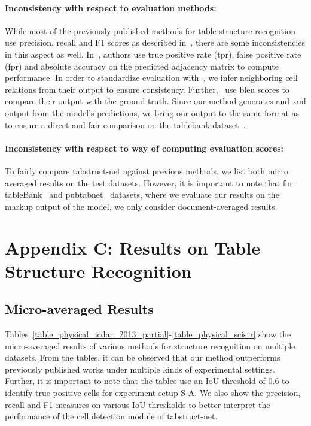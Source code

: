 \documentclass[runningheads]{llncs}
\begin{document}
\paragraph{\textbf{Inconsistency with respect to evaluation methods:}} While most of the previously published methods for table structure recognition use precision, recall and F1 scores as described in~\cite{gobel2013icdar}, there are some inconsistencies in this aspect as well. In~\cite{qasim2019rethinking}, authors use true positive rate ({\sc tpr}), false positive rate ({\sc fpr}) and absolute accuracy on the predicted adjacency matrix to compute performance. In order to standardize evaluation with~\cite{qasim2019rethinking}, we infer neighboring cell relations from their output to ensure consistency. Further,~\cite{paliwal2019tablenet} use {\sc bleu} scores to compare their output with the ground truth. Since our method generates and {\sc xml} output from the model's predictions, we bring our output to the same format as~\cite{paliwal2019tablenet} to ensure a direct and fair comparison on the {\sc t}able{\sc b}ank dataset~\cite{li2019tablebank}.

\paragraph{\textbf{Inconsistency with respect to way of computing evaluation scores:}} To fairly compare {\sc t}ab{\sc s}truct-{\sc n}et against previous methods, we list both micro averaged results on the test datasets. However, it is important to note that for {\sc t}able{\sc B}ank~\cite{li2019tablebank} and {\sc p}ub{\sc t}ab{\sc n}et~\cite{zhong2019image} datasets, where we evaluate our results on the markup output of the model, we only consider document-averaged results.

\section*{Appendix C: Results on Table Structure Recognition}

\subsection*{Micro-averaged Results}

Tables~\ref{table_physical_icdar_2013_partial}-\ref{table_physical_scistr} show the micro-averaged results of various methods for structure recognition on multiple datasets. From the tables, it can be observed that our method outperforms previously published works under multiple kinds of experimental settings. Further, it is important to note that the tables use an IoU threshold of 0.6 to identify true positive cells for experiment setup S-A. We also show the precision, recall and F1 measures on various IoU thresholds to better interpret the performance of the cell detection module of {\sc t}ab{\sc s}truct-{\sc n}et.
\end{document}
